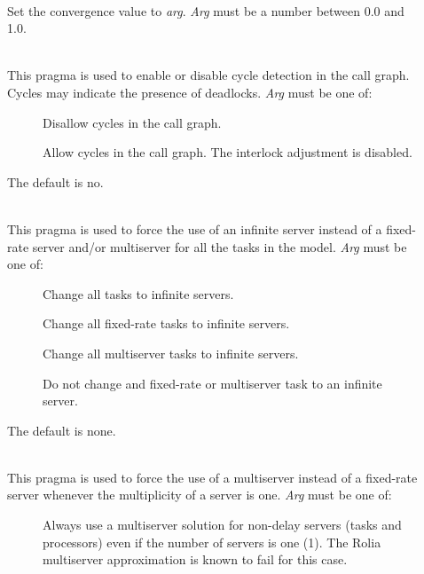 \begin{description}
\item[]~\\
Set the convergence value to \emph{arg}.  
\emph{Arg} must be a number between 0.0 and 1.0.
\item[]~\\
This pragma is used to enable or disable cycle detection in the call
graph.  Cycles may indicate the presence of deadlocks.
\emph{Arg} must be one of: 
\begin{description}
\item[]
Disallow cycles in the call graph.
\item[]
Allow cycles in the call graph.  The interlock adjustment is disabled.
\end{description}
The default is no.
\item[]~\\
This pragma is used to force the use of an infinite
server instead of a fixed-rate server and/or multiserver for all the tasks in the model.
\emph{Arg} must be one of: 
\begin{description}
\item[]
Change all tasks to infinite servers.
\item[]
Change all fixed-rate tasks to infinite servers.
\item[]
Change all multiserver tasks to infinite servers.
\item[]
Do not change and fixed-rate or multiserver task to an infinite server.
\end{description}
The default is none.
\item[]~\\
This pragma is used to force the use of a multiserver
instead of a fixed-rate server whenever the multiplicity of a server is one.
\emph{Arg} must be one of: 
\begin{description}
\item[]
Always use a multiserver solution for non-delay servers (tasks and processors) even if the number of servers is one (1).
The Rolia multiserver approximation is known to fail for this case.
\item[]

\end{description}
\end{description}
